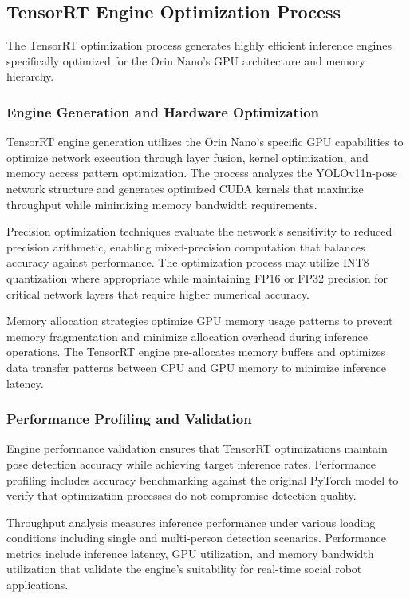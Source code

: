 \subsection{TensorRT Engine Optimization Process}

The TensorRT optimization process generates highly efficient inference engines specifically optimized for the Orin Nano's GPU architecture and memory hierarchy.

\subsubsection{Engine Generation and Hardware Optimization}

TensorRT engine generation utilizes the Orin Nano's specific GPU capabilities to optimize network execution through layer fusion, kernel optimization, and memory access pattern optimization. The process analyzes the YOLOv11n-pose network structure and generates optimized CUDA kernels that maximize throughput while minimizing memory bandwidth requirements.

Precision optimization techniques evaluate the network's sensitivity to reduced precision arithmetic, enabling mixed-precision computation that balances accuracy against performance. The optimization process may utilize INT8 quantization where appropriate while maintaining FP16 or FP32 precision for critical network layers that require higher numerical accuracy.

Memory allocation strategies optimize GPU memory usage patterns to prevent memory fragmentation and minimize allocation overhead during inference operations. The TensorRT engine pre-allocates memory buffers and optimizes data transfer patterns between CPU and GPU memory to minimize inference latency.

\subsubsection{Performance Profiling and Validation}

Engine performance validation ensures that TensorRT optimizations maintain pose detection accuracy while achieving target inference rates. Performance profiling includes accuracy benchmarking against the original PyTorch model to verify that optimization processes do not compromise detection quality.

Throughput analysis measures inference performance under various loading conditions including single and multi-person detection scenarios. Performance metrics include inference latency, GPU utilization, and memory bandwidth utilization that validate the engine's suitability for real-time social robot applications.

